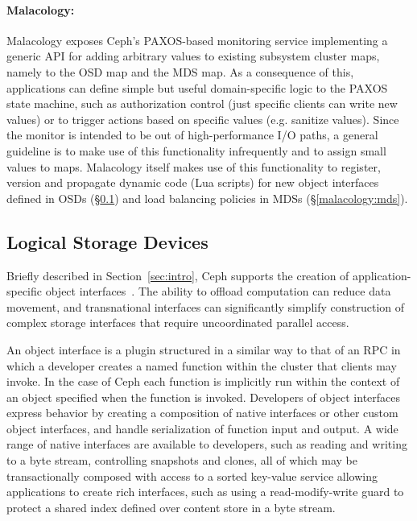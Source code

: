 \documentclass[preprint]{sigplanconf-eurosys}
\begin{document}
\paragraph*{Malacology:} Malacology exposes Ceph's PAXOS-based monitoring
service implementing a generic API
for adding arbitrary values to existing subsystem cluster maps, namely to the 
OSD map and the MDS map. As a consequence of this, applications can define 
simple but useful domain-specific logic to the PAXOS state machine, such as 
authorization control (just specific clients can write new values) or to trigger 
actions based on specific values (e.g. sanitize values). Since the monitor is 
intended to be out of high-performance I/O paths, a general guideline is to make 
use of this functionality infrequently and to assign small values to maps. 
Malacology itself makes use of this functionality to register, version and 
propagate dynamic code (Lua scripts) for new object interfaces defined in OSDs 
(\S\ref{active-storage}) and load balancing policies in MDSs 
(\S\ref{malacology:mds}).

\subsection{Logical Storage Devices}
\label{active-storage}

Briefly described in Section~\ref{sec:intro}, Ceph supports the creation
of application-specific object interfaces~\cite{weil_rados_2007}. The ability
to offload computation can reduce data movement, and transnational interfaces can
significantly simplify construction of complex storage interfaces that require
uncoordinated parallel access. 

An object interface is a plugin structured in a similar way to that of an RPC
in which a developer creates a named function within the cluster that clients
may invoke. In the case of Ceph each function is implicitly run within the
context of an object specified when the function is invoked. Developers of
object interfaces express behavior by creating a composition of native
interfaces or other custom object interfaces, and handle serialization of
function input and output. A wide range of native interfaces are available to
developers, such as reading and writing to a byte stream, controlling snapshots
and clones, all of which may be transactionally composed with access to a
sorted key-value service allowing applications to create rich interfaces, such
as using a read-modify-write guard to protect a shared index defined over
content store in a byte stream.
\end{document}
